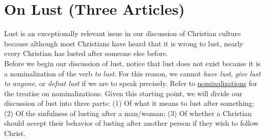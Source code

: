 \documentclass[a4paper, parskip=full, 12pt]{article}
\begin{document}
\section{On Lust (Three Articles)}
Lust is an exceptionally relevant issue in our discussion of Christian culture because although most Christians have heard that it is wrong to lust, nearly every Christian has lusted after someone else before. \\
\break
Before we begin our discussion of lust, notice that lust does not exist because it is a nominalization of the verb \textit{to lust}. For this reason, we cannot \textit{have lust}, \textit{give lust to anyone}, or \textit{defeat lust} if we are to speak precisely. Refer to \underline{nominalizations} for the treatise on nominalizations. Given this starting point, we will divide our discussion of lust into three parts: (1) Of what it means to lust after something; (2) Of the sinfulness of lusting after a man/woman; (3) Of whether a Christian should accept their behavior of lusting after another person if they wish to follow Christ. \\
\end{document}
